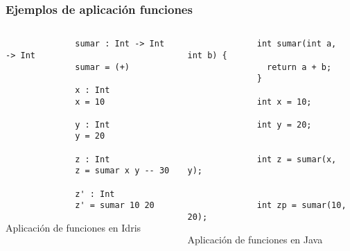 \documentclass{beamer}
\begin{document}
\begin{frame}[fragile]
  \frametitle{Ejemplos de aplicación funciones}
  \begin{columns}[T]

    \begin{column}{.48\textwidth}
      \begin{listing}[H]
        \begin{center}
          \begin{minipage}{0.6\textwidth}
              \begin{verbatim}
              sumar : Int -> Int -> Int
              sumar = (+)

              x : Int
              x = 10

              y : Int
              y = 20

              z : Int
              z = sumar x y -- 30

              z' : Int
              z' = sumar 10 20
              \end{verbatim}
          \end{minipage}
        \end{center}
        \caption{Aplicación de funciones en Idris}
        \label{lst:apfunidris1}
      \end{listing}
    \end{column}


    \hspace{-0.05\textwidth}
    \vrule
    \hspace{0.025\textwidth}

    \begin{column}{.5\textwidth}
      \begin{listing}[H]
        \begin{center}
          \begin{minipage}{\textwidth}
              \begin{verbatim}
              int sumar(int a, int b) {
                return a + b;
              }

              int x = 10;

              int y = 20;


              int z = sumar(x, y);


              int zp = sumar(10, 20);
              \end{verbatim}
          \end{minipage}
        \end{center}
        \caption{Aplicación de funciones en Java}
        \label{lst:apfunjava1}
      \end{listing}
    \end{column}

  \end{columns}
\end{frame}
\end{document}

